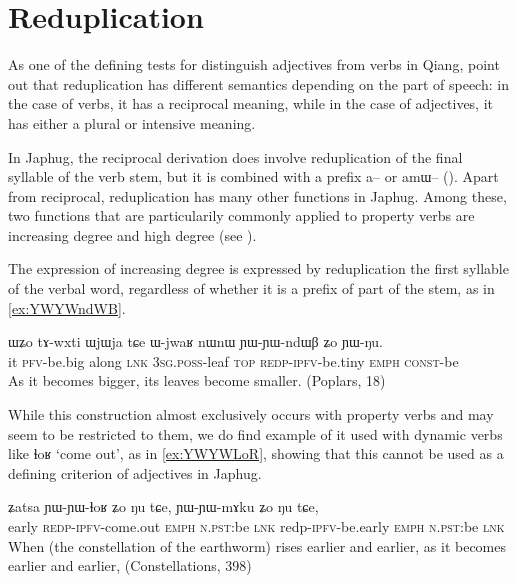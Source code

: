 \documentclass[oldfontcommands,oneside,a4paper,11pt]{article}
\newcommand{\ipa}[1]{{\phon \mbox{#1}}} %
\begin{document}
 \section{Reduplication}
As one of the defining tests for distinguish adjectives from verbs in Qiang, \citet[315]{lapolla04adj} point out that reduplication has   different semantics depending on the part of speech: in the case of verbs, it has a reciprocal meaning, while in the case of adjectives, it has either a plural or intensive meaning.


In Japhug, the reciprocal derivation does involve reduplication of the final syllable of the verb stem, but it is combined with a prefix \ipa{a--} or \ipa{amɯ--} (\citealt{jacques12demotion}). Apart from reciprocal, reduplication has many other functions in Japhug. Among these, two functions that are particularily commonly applied to property verbs are increasing degree and high degree (see \citealt{jacques07redupl}).

The expression of increasing degree is expressed by reduplication the first syllable of the verbal word, regardless of whether it is a prefix of part of the stem, as in \ref{ex:YWYWndWB}.
 
\begin{exe}
\ex \label{ex:YWYWndWB}
\gll 
\ipa{ɯʑo} 	\ipa{tɤ-wxti} 	\ipa{ɯjɯja} 	\ipa{tɕe} 	\ipa{ɯ-jwaʁ} 	\ipa{nɯnɯ} 	\ipa{ɲɯ-ɲɯ-ndɯβ} 	\ipa{ʑo} 	\ipa{ɲɯ-ŋu.} 	\\
it \textsc{pfv}-be.big along \textsc{lnk} \textsc{3sg.poss}-leaf \textsc{top} \textsc{redp-ipfv}-be.tiny  \textsc{emph} \textsc{const}-be \\
\glt As it becomes bigger, its leaves become smaller. (Poplars, 18)
\end{exe}


While this construction almost exclusively occurs with property verbs and may seem to  be restricted to them, we do find example of it used with dynamic verbs like \ipa{ɬoʁ} `come out', as in \ref{ex:YWYWLoR}, showing that this cannot be used as a defining criterion of adjectives in Japhug.

\begin{exe}
\ex \label{ex:YWYWLoR}
\gll 
\ipa{ʑatsa} 	\ipa{ɲɯ-ɲɯ-ɬoʁ} 	\ipa{ʑo} 	\ipa{ŋu} 	\ipa{tɕe,} 	\ipa{ɲɯ-ɲɯ-mɤku} 	\ipa{ʑo} 	\ipa{ŋu} 	\ipa{tɕe,} \\
early \textsc{redp-ipfv}-come.out \textsc{emph} \textsc{n.pst}:be \textsc{lnk} redp-\textsc{ipfv}-be.early \textsc{emph} \textsc{n.pst}:be  \textsc{lnk} \\
\glt When (the constellation of the earthworm) rises earlier and earlier, as it becomes earlier and earlier,   (Constellations, 398)
\end{exe}
\end{document}
